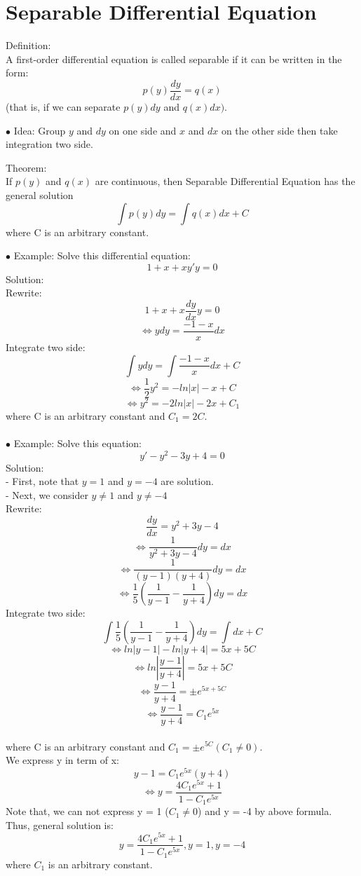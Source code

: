 \documentclass[12pt]{article}
\begin{document}
\section{Separable Differential Equation}
\begin{mybox}
Definition: \\
    A first-order differential equation is called separable if it can be written in the form:
    $$p(y) \frac{dy}{dx}=q(x)$$
    (that is, if we can separate $p(y) dy$ and $q(x) dx)$.
\end{mybox}
$\bullet$ Idea: Group $y$ and $dy$ on one side and $x$ and $dx$ on the other side then take integration two side.  
\begin{mybox}
    Theorem: \\ 
    If $p(y)$ and $q(x)$ are continuous, then Separable Differential Equation has the general solution
    $$\displaystyle \int p(y)dy = \displaystyle \int q(x)dx + C$$
    where C is an arbitrary constant.
\end{mybox}
$\bullet$ Example: Solve this differential equation: \\
 $$1 + x +xy'y = 0$$
 Solution: \\
 Rewrite: \\
 $$1 + x + x \frac{dy}{dx} y = 0$$
 $$\Leftrightarrow y dy= \frac{-1 -x}{x}dx$$
 Integrate two side: \\
 $$\displaystyle \int ydy = \displaystyle \int \frac{-1-x}{x}dx +C$$
 $$\Leftrightarrow \frac{1}{2}y^2 = -ln|x| - x +C$$
 $$\Leftrightarrow y^2 = -2ln|x| -2x +C_1$$
 where C is  an arbitrary constant and $C_1 = 2C$. \\
\\
 $\bullet$ Example: Solve this equation: \\
 $$y' - y^2 -3y + 4 =0$$
 Solution: \\
 - First, note that $y = 1$ and $y = -4$ are solution.\\
 - Next, we consider $y \neq 1$ and $y \neq -4$
 \\
 Rewrite: \\
 $$\frac{dy}{dx} = y^2 +3y - 4  $$
 $$ \Leftrightarrow \frac{1}{y^2 +3y - 4}dy = dx  $$
 $$\Leftrightarrow \frac{1}{(y-1)(y+4)}dy = dx$$
 $$\Leftrightarrow \frac{1}{5}( \frac{1}{y-1} - \frac{1}{y+4})dy = dx$$
 Integrate two side: \\
 $$\displaystyle \int \frac{1}{5}( \frac{1}{y-1} - \frac{1}{y+4})dy = \displaystyle \int dx +C$$
 $$\Leftrightarrow ln|y-1| - ln|y+4| = 5x +5C$$
 $$ \Leftrightarrow ln |\frac{y-1}{y+4}|= 5x +5C$$
 $$\Leftrightarrow \frac{y-1}{y+4} = \pm e^{5x+5C} $$
 $$\Leftrightarrow \frac{y-1}{y+4} = C_1e^{5x} $$
 \\
 where C is an arbitrary constant and $C_1 = \pm e^{5C}(C_1\neq 0)$.\\
 We express y in term of x: \\
 $$y - 1 = C_1e^{5x}(y+4) $$
$$\Leftrightarrow y = \frac{4C_1e^{5x}+1}{1-C_1e^{5x}}$$
Note that, we can not express y = 1 ($C_1 \neq 0$) and y = -4 by above formula. Thus, general solution is: 
$$y = \frac{4C_1e^{5x}+1}{1-C_1e^{5x}} , y = 1,y = -4$$
where $C_1$ is an arbitrary constant.
\end{document}
